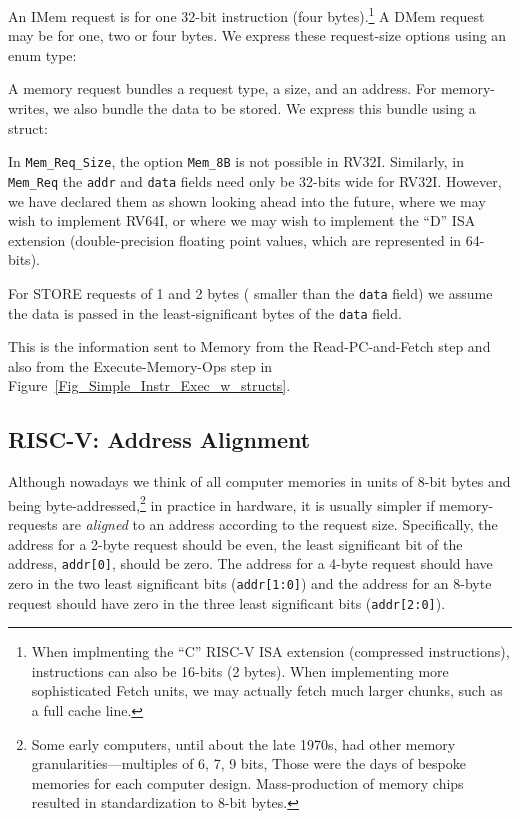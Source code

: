 

An IMem request is for one 32-bit instruction (four
bytes).\footnote{When implmenting the ``C'' RISC-V ISA extension
(compressed instructions), instructions can also be 16-bits (2 bytes).
When implementing more sophisticated Fetch units, we may actually
fetch much larger chunks, such as a full cache line.}  A DMem request
may be for one, two or four bytes.  We express these request-size
options using an enum type:



A memory request bundles a request type, a size, and an address.  For
memory-writes, we also bundle the data to be stored.  We express this
bundle using a struct:



In \verb|Mem_Req_Size|, the option \verb|Mem_8B| is not possible in
RV32I.  Similarly, in \verb|Mem_Req| the \verb|addr| and \verb|data|
fields need only be 32-bits wide for RV32I.  However, we have declared
them as shown looking ahead into the future, where we may wish to
implement RV64I, or where we may wish to implement the ``D'' ISA
extension (double-precision floating point values, which are
represented in 64-bits).

For STORE requests of 1 and 2 bytes ({\ie} smaller than the \verb|data|
field) we assume the data is passed in the least-significant bytes of
the \verb|data| field.

This is the information sent to Memory from the Read-PC-and-Fetch step
and also from the Execute-Memory-Ops step in
Figure~\ref{Fig_Simple_Instr_Exec_w_structs}.


\subsection{RISC-V: Address Alignment}


Although nowadays we think of all computer memories in units of 8-bit
bytes and being byte-addressed,\footnote{Some early computers, until
about the late 1970s, had other memory granularities---multiples of 6,
7, 9 bits, {\etc} Those were the days of bespoke memories for each
computer design.  Mass-production of memory chips resulted in
standardization to 8-bit bytes.} in practice in hardware, it is
usually simpler if memory-requests are \emph{aligned} to an address
according to the request size.  Specifically, the address for a 2-byte
request should be even, {\ie} the least significant bit of the
address, \verb|addr[0]|, should be zero.  The address for a 4-byte
request should have zero in the two least significant bits
(\verb|addr[1:0]|) and the address for an 8-byte request should have
zero in the three least significant bits (\verb|addr[2:0]|).

